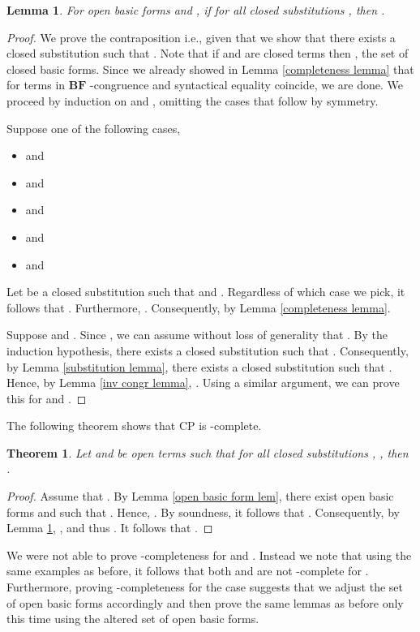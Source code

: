 \documentclass[a4paper,twoside,openright]{report}
\newcommand{\BF}{\ensuremath{\textbf{BF}}}
\newtheorem{lem}[theorem]{Lemma}
\newtheorem{thm}[theorem]{Theorem}
\begin{document}
\begin{lem}\label{omega lem}
For open basic forms  and , if for all closed substitutions ,  then .
\end{lem}
\begin{proof}
We prove the contraposition i.e., given that  we show that there exists a closed substitution  such that . Note that if  and  are closed terms then , the set of closed basic forms. Since we already showed in Lemma \ref{completeness lemma} that for terms in \BF{} -congruence and syntactical equality coincide, we are done. We proceed by induction on  and , omitting the cases that follow by symmetry.

Suppose one of the following cases,
\begin{itemize}
\item  and 
\item  and 
\item  and 
\item  and 
\item  and 
\end{itemize}
Let  be a closed substitution such that  and . Regardless of which case we pick, it follows that . Furthermore, . Consequently,  by Lemma \ref{completeness lemma}.

Suppose  and . Since , we can assume without loss of generality that . By the induction hypothesis, there exists a closed substitution  such that . Consequently, by Lemma \ref{substitution lemma}, there exists a closed substitution  such that . Hence, by Lemma \ref{inv congr lemma}, . Using a similar argument, we can prove this for  and .
\end{proof}

The following theorem shows that CP is -complete.

\begin{thm}
Let  and  be open terms such that for all closed substitutions , , then .
\end{thm}
\begin{proof}
Assume that . By Lemma \ref{open basic form lem}, there exist open basic forms  and  such that . Hence, . By soundness, it follows that . Consequently, by Lemma \ref{omega lem}, , and thus . It follows that .
\end{proof}

We were not able to prove -completeness for  and . Instead we note that using the same examples as before, it follows that both  and  are not -complete for . Furthermore, proving -completeness for the case  suggests that we adjust the set of open basic forms accordingly and then prove the same lemmas as before only this time using the altered set of open basic forms. 
\end{document}
